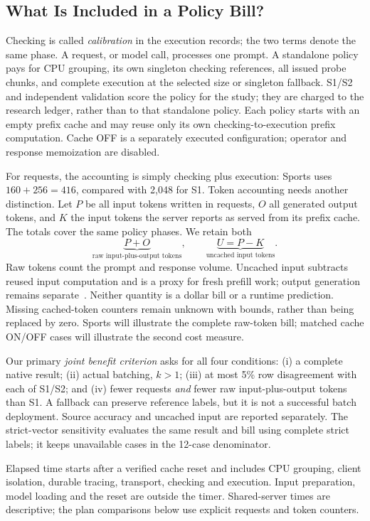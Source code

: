 \subsection{What Is Included in a Policy Bill?}
\label{sec:resources}
Checking is called \emph{calibration} in the execution records; the two terms denote the same phase. A request, or model call, processes one prompt. A standalone policy pays for CPU grouping, its own singleton checking references, all issued probe chunks, and complete execution at the selected size or singleton fallback. S1/S2 and independent validation score the policy for the study; they are charged to the research ledger, rather than to that standalone policy. Each policy starts with an empty prefix cache and may reuse only its own checking-to-execution prefix computation. Cache OFF is a separately executed configuration; operator and response memoization are disabled.

For requests, the accounting is simply checking plus execution: Sports uses $160+256=416$, compared with 2,048 for S1. Token accounting needs another distinction. Let $P$ be all input tokens written in requests, $O$ all generated output tokens, and $K$ the input tokens the server reports as served from its prefix cache. The totals cover the same policy phases. We retain both
\begin{equation}
\underbrace{P+O}_{\text{raw input-plus-output tokens}},\qquad
\underbrace{U=P-K}_{\text{uncached input tokens}}.
\label{eq:costs}
\end{equation}
Raw tokens count the prompt and response volume. Uncached input subtracts reused input computation and is a proxy for fresh prefill work; output generation remains separate~\cite{apc}. Neither quantity is a dollar bill or a runtime prediction. Missing cached-token counters remain unknown with bounds, rather than being replaced by zero. Sports will illustrate the complete raw-token bill; matched cache ON/OFF cases will illustrate the second cost measure.

Our primary \emph{joint benefit criterion} asks for all four conditions: (i) a complete native result; (ii) actual batching, $k>1$; (iii) at most 5\% row disagreement with each of S1/S2; and (iv) fewer requests \emph{and} fewer raw input-plus-output tokens than S1. A fallback can preserve reference labels, but it is not a successful batch deployment. Source accuracy and uncached input are reported separately. The strict-vector sensitivity evaluates the same result and bill using complete strict labels; it keeps unavailable cases in the 12-case denominator.

Elapsed time starts after a verified cache reset and includes CPU grouping, client isolation, durable tracing, transport, checking and execution. Input preparation, model loading and the reset are outside the timer. Shared-server times are descriptive; the plan comparisons below use explicit requests and token counters.

